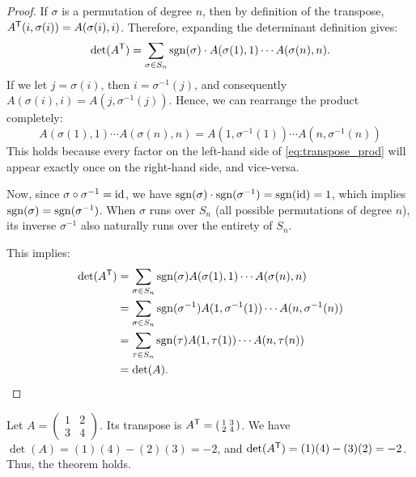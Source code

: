 \begin{proof}
  If $\sigma$ is a permutation of degree $n$, then by definition of the transpose, $A^{\mathsf{T}}(i, \sigma(i)) = A(\sigma(i), i)$.
  Therefore, expanding the determinant definition gives:
  \[
  \det(A^{\mathsf{T}}) = \sum_{\sigma \in S_n} \operatorname{sgn}(\sigma) \cdot A(\sigma(1), 1) \cdots A(\sigma(n), n).
  \]
  If we let $j = \sigma(i)$, then $i = \sigma^{-1}(j)$, and consequently $A(\sigma(i), i) = A(j, \sigma^{-1}(j))$. Hence, we can rearrange the product completely:
  \begin{equation} \label{eq:transpose_prod}
    A(\sigma(1), 1) \cdots A(\sigma(n), n) = A(1, \sigma^{-1}(1)) \cdots A(n, \sigma^{-1}(n))
  \end{equation}
  This holds because every factor on the left-hand side of \eqref{eq:transpose_prod} will appear exactly once on the right-hand side, and vice-versa.

  Now, since $\sigma \circ \sigma^{-1} = \operatorname{id}$, we have $\operatorname{sgn}(\sigma) \cdot \operatorname{sgn}(\sigma^{-1}) = \operatorname{sgn}(\operatorname{id}) = 1$, which implies $\operatorname{sgn}(\sigma) = \operatorname{sgn}(\sigma^{-1})$.
  When $\sigma$ runs over $S_n$ (all possible permutations of degree $n$), its inverse $\sigma^{-1}$ also naturally runs over the entirety of $S_n$.

  This implies:
  \begin{align*}
    \det(A^{\mathsf{T}}) &= \sum_{\sigma \in S_n} \operatorname{sgn}(\sigma) A(\sigma(1), 1) \cdots A(\sigma(n), n) \\
    &= \sum_{\sigma \in S_n} \operatorname{sgn}(\sigma^{-1}) A(1, \sigma^{-1}(1)) \cdots A(n, \sigma^{-1}(n)) \\
    &= \sum_{\tau \in S_n} \operatorname{sgn}(\tau) A(1, \tau(1)) \cdots A(n, \tau(n)) \\
    &= \det(A).
  \end{align*}
\end{proof}

\begin{example}
  Let $A = \left(\begin{smallmatrix} 1 & 2 \\ 3 & 4 \end{smallmatrix}\right)$. Its transpose is $A^{\mathsf{T}} = \left(\begin{smallmatrix} 1 & 3 \\ 2 & 4 \end{smallmatrix}\right)$. We have $\det(A) = (1)(4) - (2)(3) = -2$, and $\det(A^{\mathsf{T}}) = (1)(4) - (3)(2) = -2$. Thus, the theorem holds.
\end{example}

